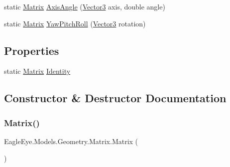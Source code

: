 \begin{DoxyCompactItemize}
\item 
static \mbox{\hyperlink{class_eagle_eye_1_1_models_1_1_geometry_1_1_matrix}{Matrix}} \mbox{\hyperlink{class_eagle_eye_1_1_models_1_1_geometry_1_1_matrix_af76e4c9c86e25fab681c2f7a652541c4}{Axis\+Angle}} (\mbox{\hyperlink{struct_eagle_eye_1_1_models_1_1_geometry_1_1_vector3}{Vector3}} axis, double angle)
\item 
static \mbox{\hyperlink{class_eagle_eye_1_1_models_1_1_geometry_1_1_matrix}{Matrix}} \mbox{\hyperlink{class_eagle_eye_1_1_models_1_1_geometry_1_1_matrix_a7d060933c0b5d60c2cc161a21555515e}{Yaw\+Pitch\+Roll}} (\mbox{\hyperlink{struct_eagle_eye_1_1_models_1_1_geometry_1_1_vector3}{Vector3}} rotation)
\end{DoxyCompactItemize}
\subsection*{Properties}
\begin{DoxyCompactItemize}
\item 
static \mbox{\hyperlink{class_eagle_eye_1_1_models_1_1_geometry_1_1_matrix}{Matrix}} \mbox{\hyperlink{class_eagle_eye_1_1_models_1_1_geometry_1_1_matrix_a13de6eaef457ac2295454d66c87b2a3b}{Identity}}
\end{DoxyCompactItemize}


\subsection{Constructor \& Destructor Documentation}
\mbox{\label{class_eagle_eye_1_1_models_1_1_geometry_1_1_matrix_a81deff683b5e1aad589bd0823054ae15}} 
\subsubsection{\texorpdfstring{Matrix()}{Matrix()}\hspace{0.1cm}{\footnotesize\ttfamily [1/3]}}
{\footnotesize\ttfamily Eagle\+Eye.\+Models.\+Geometry.\+Matrix.\+Matrix (\begin{DoxyParamCaption}{ }\end{DoxyParamCaption})}

